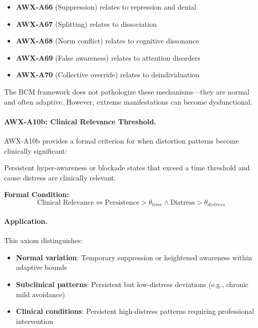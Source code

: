 \begin{itemize}
    \item \textbf{AWX-A66} (Suppression) relates to repression and denial
    \item \textbf{AWX-A67} (Splitting) relates to dissociation
    \item \textbf{AWX-A68} (Norm conflict) relates to cognitive dissonance
    \item \textbf{AWX-A69} (False awareness) relates to attention disorders
    \item \textbf{AWX-A70} (Collective override) relates to deindividuation
\end{itemize}

The BCM framework does not pathologize these mechanisms—they are normal 
and often adaptive. However, extreme manifestations can become dysfunctional.


\paragraph{AWX-A10b: Clinical Relevance Threshold.}
AWX-A10b provides a formal criterion for when distortion patterns become 
clinically significant:

\begin{axiom}
Persistent hyper-awareness or blockade states that exceed a time threshold 
and cause distress are clinically relevant.

\textbf{Formal Condition:}
\begin{equation}
\text{Clinical Relevance} \Leftrightarrow 
\text{Persistence} > \theta_{time} \land \text{Distress} > \theta_{distress}
\end{equation}
\end{axiom}

\paragraph{Application.}
This axiom distinguishes:
\begin{itemize}
    \item \textbf{Normal variation}: Temporary suppression or heightened 
          awareness within adaptive bounds
    \item \textbf{Subclinical patterns}: Persistent but low-distress 
          deviations (e.g., chronic mild avoidance)
    \item \textbf{Clinical conditions}: Persistent high-distress patterns 
          requiring professional intervention
\end{itemize}

